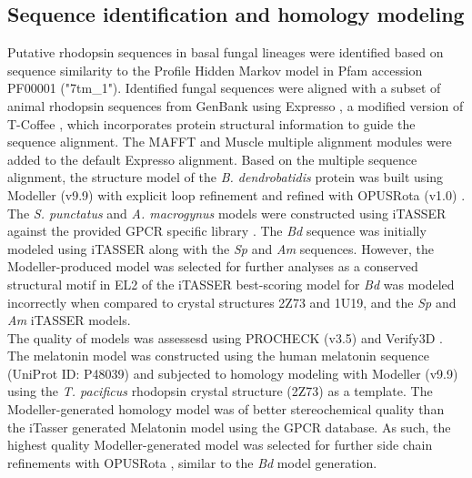 \subsection*{Sequence identification and homology modeling}
Putative rhodopsin sequences in basal fungal lineages were identified based on sequence similarity to the Profile Hidden Markov model in Pfam accession PF00001 ("7tm\_1"). Identified fungal sequences were aligned with a subset of animal rhodopsin sequences from GenBank using Expresso \cite{Armougom2006}, a modified version of T-Coffee \cite{Notredame2000}, which incorporates protein structural information to guide the sequence alignment. The MAFFT \cite{Katoh2002,Katoh2005} and Muscle \cite{Edgar2004} multiple alignment modules were added to the default Expresso alignment. Based on the multiple sequence alignment, the structure model of the \textit{B. dendrobatidis} protein was built using Modeller (v9.9) \cite{Eswar2007} with explicit loop refinement and refined with OPUSRota (v1.0) \cite{Lu2008}. The \textit{S. punctatus} and \textit{A. macrogynus} models were constructed using iTASSER against the provided GPCR specific library \cite{Zhang2008}. The \textit{Bd} sequence was initially modeled using iTASSER along with the \textit{Sp} and \textit{Am} sequences. However, the Modeller-produced model was selected for further analyses as a conserved structural motif in EL2 of the iTASSER best-scoring model for \textit{Bd} was modeled incorrectly when compared to crystal structures 2Z73 and 1U19, and the \textit{Sp} and \textit{Am} iTASSER models.\\ 
\indent The quality of models was assessesd using PROCHECK (v3.5) \cite{Laskowski1993,Wiederstein2007} and Verify3D \cite{Luthy1992}. The melatonin model was constructed using the human melatonin sequence (UniProt ID: P48039) and subjected to homology modeling with Modeller (v9.9) \cite{Eswar2007} using the \textit{T. pacificus} rhodopsin crystal structure (2Z73) as a template. The Modeller-generated homology model was of better stereochemical quality than the iTasser generated Melatonin model using the GPCR database. As such, the highest quality Modeller-generated model was selected for further side chain refinements with OPUSRota \cite{Lu2008}, similar to the \textit{Bd} model generation.\\
